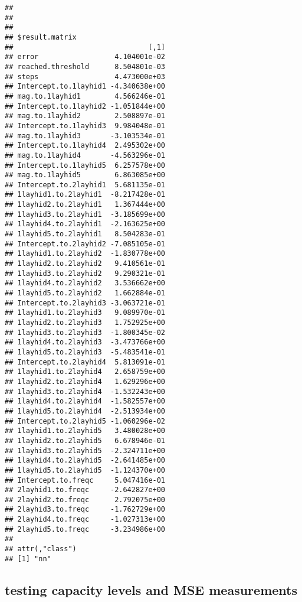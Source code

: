 \documentclass[
]{article}
\begin{document}
\begin{verbatim}
## 
## 
## 
## $result.matrix
##                                [,1]
## error                  4.104001e-02
## reached.threshold      8.504801e-03
## steps                  4.473000e+03
## Intercept.to.1layhid1 -4.340638e+00
## mag.to.1layhid1        4.566246e-01
## Intercept.to.1layhid2 -1.051844e+00
## mag.to.1layhid2        2.508897e-01
## Intercept.to.1layhid3  9.984048e-01
## mag.to.1layhid3       -3.103534e-01
## Intercept.to.1layhid4  2.495302e+00
## mag.to.1layhid4       -4.563296e-01
## Intercept.to.1layhid5  6.257578e+00
## mag.to.1layhid5        6.863085e+00
## Intercept.to.2layhid1  5.681135e-01
## 1layhid1.to.2layhid1  -8.217428e-01
## 1layhid2.to.2layhid1   1.367444e+00
## 1layhid3.to.2layhid1  -3.185699e+00
## 1layhid4.to.2layhid1  -2.163625e+00
## 1layhid5.to.2layhid1   8.504283e-01
## Intercept.to.2layhid2 -7.085105e-01
## 1layhid1.to.2layhid2  -1.830778e+00
## 1layhid2.to.2layhid2   9.410561e-01
## 1layhid3.to.2layhid2   9.290321e-01
## 1layhid4.to.2layhid2   3.536662e+00
## 1layhid5.to.2layhid2   1.662884e-01
## Intercept.to.2layhid3 -3.063721e-01
## 1layhid1.to.2layhid3   9.089970e-01
## 1layhid2.to.2layhid3   1.752925e+00
## 1layhid3.to.2layhid3  -1.800345e-02
## 1layhid4.to.2layhid3  -3.473766e+00
## 1layhid5.to.2layhid3  -5.483541e-01
## Intercept.to.2layhid4  5.813091e-01
## 1layhid1.to.2layhid4   2.658759e+00
## 1layhid2.to.2layhid4   1.629296e+00
## 1layhid3.to.2layhid4  -1.532243e+00
## 1layhid4.to.2layhid4  -1.582557e+00
## 1layhid5.to.2layhid4  -2.513934e+00
## Intercept.to.2layhid5 -1.060296e-02
## 1layhid1.to.2layhid5   3.480028e+00
## 1layhid2.to.2layhid5   6.678946e-01
## 1layhid3.to.2layhid5  -2.324711e+00
## 1layhid4.to.2layhid5  -2.641485e+00
## 1layhid5.to.2layhid5  -1.124370e+00
## Intercept.to.freqc     5.047416e-01
## 2layhid1.to.freqc     -2.642827e+00
## 2layhid2.to.freqc      2.792075e+00
## 2layhid3.to.freqc     -1.762729e+00
## 2layhid4.to.freqc     -1.027313e+00
## 2layhid5.to.freqc     -3.234986e+00
## 
## attr(,"class")
## [1] "nn"
\end{verbatim}

\hypertarget{testing-capacity-levels-and-mse-measurements}{%
\subsection{testing capacity levels and MSE
measurements}\label{testing-capacity-levels-and-mse-measurements}}
\end{document}
